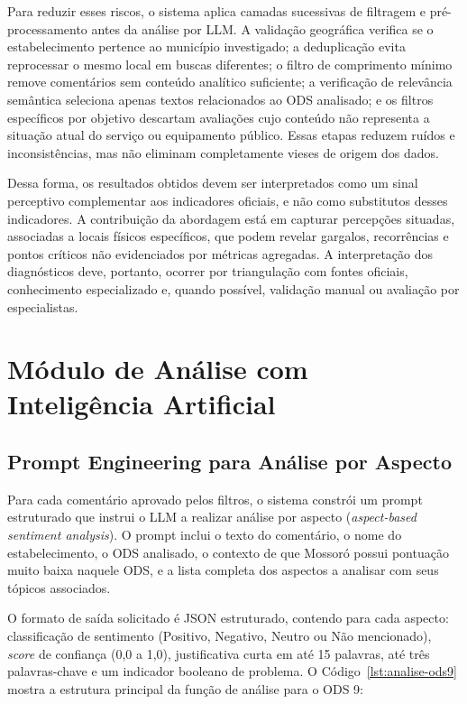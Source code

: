 Para reduzir esses riscos, o sistema aplica camadas sucessivas de filtragem e pré-processamento antes da análise por \gls{LLM}. A validação geográfica verifica se o estabelecimento pertence ao município investigado; a deduplicação evita reprocessar o mesmo local em buscas diferentes; o filtro de comprimento mínimo remove comentários sem conteúdo analítico suficiente; a verificação de relevância semântica seleciona apenas textos relacionados ao ODS analisado; e os filtros específicos por objetivo descartam avaliações cujo conteúdo não representa a situação atual do serviço ou equipamento público. Essas etapas reduzem ruídos e inconsistências, mas não eliminam completamente vieses de origem dos dados.

Dessa forma, os resultados obtidos devem ser interpretados como um sinal perceptivo complementar aos indicadores oficiais, e não como substitutos desses indicadores. A contribuição da abordagem está em capturar percepções situadas, associadas a locais físicos específicos, que podem revelar gargalos, recorrências e pontos críticos não evidenciados por métricas agregadas. A interpretação dos diagnósticos deve, portanto, ocorrer por triangulação com fontes oficiais, conhecimento especializado e, quando possível, validação manual ou avaliação por especialistas.

\section{Módulo de Análise com Inteligência Artificial}
\label{sec:analise-ia}

\subsection{Prompt Engineering para Análise por Aspecto}
\label{subsec:prompt}

Para cada comentário aprovado pelos filtros, o sistema constrói um prompt estruturado que instrui o LLM a realizar análise por aspecto (\textit{aspect-based sentiment analysis}). O prompt inclui o texto do comentário, o nome do estabelecimento, o ODS analisado, o contexto de que Mossoró possui pontuação muito baixa naquele ODS, e a lista completa dos aspectos a analisar com seus tópicos associados.

O formato de saída solicitado é JSON estruturado, contendo para cada aspecto: classificação de sentimento (Positivo, Negativo, Neutro ou Não mencionado), \textit{score} de confiança (0,0 a 1,0), justificativa curta em até 15 palavras, até três palavras-chave e um indicador booleano de problema. O Código~\ref{lst:analise-ods9} mostra a estrutura principal da função de análise para o ODS 9:

